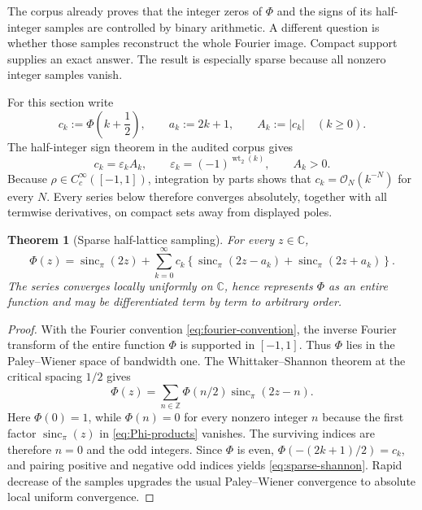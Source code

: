 \documentclass[11pt]{article}
\newtheorem{theorem}{Theorem}[section]
\theoremstyle{definition}
\theoremstyle{remark}
\newcommand{\C}{\mathbb C}
\newcommand{\wt}{\operatorname{wt}_2}
\newcommand{\eps}{\varepsilon}
\newcommand{\sincpi}{\operatorname{sinc}_{\pi}}
\newcommand{\bigO}{\mathcal O}
\begin{document}
The corpus already proves that the integer zeros of \(\Phi\) and the signs of its
half-integer samples are controlled by binary arithmetic.  A different question is whether
those samples reconstruct the whole Fourier image.  Compact support supplies an exact
answer.  The result is especially sparse because all nonzero integer samples vanish.

For this section write
\begin{equation}
 c_k:=\Phi\!\left(k+\frac12\right),\qquad a_k:=2k+1,
 \qquad A_k:=|c_k| \quad(k\ge0).                         \label{eq:ck-def}
\end{equation}
The half-integer sign theorem in the audited corpus gives
\begin{equation}
 c_k=\eps_kA_k,
 \qquad \eps_k=(-1)^{\wt(k)},
 \qquad A_k>0.                                            \label{eq:ck-sign}
\end{equation}
Because \(\rho\in C_c^\infty([-1,1])\), integration by parts shows that
\(c_k=\bigO_N(k^{-N})\) for every \(N\).  Every series below therefore converges
absolutely, together with all termwise derivatives, on compact sets away from displayed
poles.

\begin{theorem}[Sparse half-lattice sampling]
\label{thm:sparse-shannon}
For every \(z\in\C\),
\begin{equation}
\boxed{
 \Phi(z)=\sincpi(2z)
 +\sum_{k=0}^{\infty}c_k
 \left\{
   \sincpi(2z-a_k)+\sincpi(2z+a_k)
 \right\}.}                                               \label{eq:sparse-shannon}
\end{equation}
The series converges locally uniformly on \(\C\), hence represents \(\Phi\) as an
entire function and may be differentiated term by term to arbitrary order.
\end{theorem}

\begin{proof}
With the Fourier convention \eqref{eq:fourier-convention}, the inverse Fourier transform
of the entire function \(\Phi\) is supported in \([-1,1]\).  Thus \(\Phi\) lies in the
Paley--Wiener space of bandwidth one.  The Whittaker--Shannon theorem \cite{HigginsSampling} at the critical
spacing \(1/2\) gives
\begin{equation}
 \Phi(z)=\sum_{n\in\mathbb Z}\Phi(n/2)\sincpi(2z-n).
                                                               \label{eq:full-shannon}
\end{equation}
Here \(\Phi(0)=1\), while \(\Phi(n)=0\) for every nonzero integer \(n\) because the
first factor \(\sincpi(z)\) in \eqref{eq:Phi-products} vanishes.  The surviving indices
are therefore \(n=0\) and the odd integers.  Since \(\Phi\) is even,
\(\Phi(-(2k+1)/2)=c_k\), and pairing positive and negative odd indices yields
\eqref{eq:sparse-shannon}.  Rapid decrease of the samples upgrades the usual
Paley--Wiener convergence to absolute local uniform convergence.
\end{proof}
\end{document}
